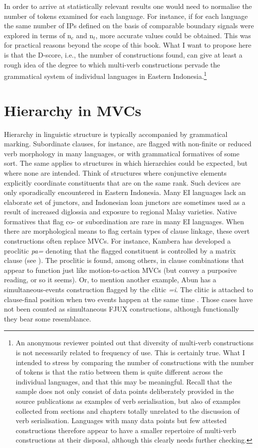 In order to arrive at statistically relevant results one would need to normalise the number of tokens examined for each language. For instance, if for each language the same number of IPs defined on the basis of comparable boundary signals were explored in terms of n$_c$ and n$_t$, more accurate values could be obtained. This was for practical reasons beyond the scope of this book. What I want to propose here is that the D-score, i.e., the number of constructions found, can give at least a rough idea of the degree to which multi-verb constructions pervade the grammatical system of individual languages in Eastern Indonesia.\footnote{An anonymous reviewer pointed out that diversity of multi-verb constructions is not necessarily related to frequency of use. This is certainly true. What I intended to stress by comparing the number of constructions with the number of tokens is that the ratio between them is quite different across the individual languages, and that this may be meaningful. Recall that the sample does not only consist of data points deliberately provided in the source publications as examples of verb serialisation, but also of examples collected from sections and chapters totally unrelated to the discussion of verb serialisation. Languages with many data points but few attested constructions therefore appear to have a smaller repertoire of multi-verb constructions at their disposal, although this clearly needs further checking.}

\section{Hierarchy in MVCs} \label{sec:hierarchy}

Hierarchy in linguistic structure is typically accompanied by grammatical marking. Subordinate clauses, for instance, are flagged with non-finite or reduced verb morphology in many languages, or with grammatical formatives of some sort. The same applies to structures in which hierarchies could be expected, but where none are intended. Think of structures where conjunctive elements explicitly coordinate constituents that are on the same rank. Such devices are only sporadically encountered in Eastern Indonesia. Many EI languages lack an elaborate set of junctors, and Indonesian loan junctors are sometimes used as a result of increased diglossia and exposure to regional Malay varieties. Native formatives that flag co- or subordination are rare in many EI languages. When there are morphological means to flag certain types of clause linkage, these overt constructions often replace MVCs. For instance, Kambera has developed a proclitic \textit{pa=} denoting that the flagged constituent is controlled by a matrix clause (see \citealt[338ff.]{klamer1998grammar}). The proclitic is found, among others, in clause combinations that appear to function just like motion-to-action MVCs (but convey a purposive reading, or so it seems). Or, to mention another example, Abun has a simultaneous-events construction flagged by the clitic \textit{=i}. The clitic is attached to clause-final position when two events happen at the same time \citep{berry1999}. Those cases have not been counted as simultaneous FJUX constructions, although functionally they bear some resemblance.

